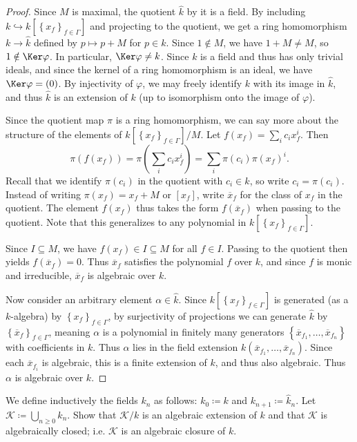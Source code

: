 \documentclass[11pt, letterpaper]{article}
\begin{document}
\begin{proof}
	Since $M$ is maximal, the quotient $\hat{k} $ by it is a field. By including $k\hookrightarrow k[\left\{ x_f \right\} _{f\in \Gamma } ]$ and projecting to the quotient, we get a ring homomorphism $k\to \hat{k} $ defined by $p\mapsto p+M$ for $p\in k$. Since $1\notin M$, we have $1+M \neq M$, so $1\notin \Ker \varphi $. In particular, $\Ker \varphi \neq k$. Since $k$ is a field and thus has only trivial ideals, and since the kernel of a ring homomorphism is an ideal, we have $\Ker \varphi =(0)$. By injectivity of $\varphi $, we may freely identify $k$ with its image in $\hat{k} $, and thus $\hat{k} $ is an extension of $k$ (up to isomorphism onto the image of $\varphi $).

	Since the quotient map $\pi $ is a ring homomorphism, we can say more about the structure of the elements of $k[\left\{ x_f \right\} _{f\in \Gamma } ]/M$. Let $f(x_f)=\sum_{i} c_ix_f^i$. Then
	\[
		\pi (f(x_f))=\pi \left( \sum_{i} c_ix_f^i \right) =\sum_{i} \pi (c_i)\pi (x_f)^i
	.\]
	Recall that we identify $\pi (c_i)$ in the quotient with $c_i\in k$, so write $c_i=\pi (c_i)$. Instead of writing $\pi (x_f)=x_f+M$ or $[x_f]$, write $\overline{x} _f$ for the class of $x_f$ in the quotient. The element $f(x_f)$ thus takes the form $f(\overline{x} _f)$ when passing to the quotient. Note that this generalizes to any polynomial in $k[\left\{ x_f \right\} _{f\in \Gamma } ]$.

	Since $I\subseteq M$, we have $f(x_f)\in I \subseteq M$ for all $f\in I$. Passing to the quotient then yields $f(\overline{x}_f)=0$. Thus $\overline{x} _f$ satisfies the polynomial $f$ over $k$, and since $f$ is monic and irreducible, $\overline{x} _f$ is algebraic over $k$.

	Now consider an arbitrary element $\alpha \in \hat{k} $. Since $k[\left\{ x_f \right\} _{f\in \Gamma } ]$ is generated (as a $k$-algebra) by $\left\{ x_f \right\} _{f\in \Gamma } $, by surjectivity of projections we can generate $\hat{k} $ by $\left\{ \overline{x}_f \right\} _{f\in \Gamma } $, meaning $\alpha $ is a polynomial in finitely many generators $\left\{ \overline{x} _{f_1} , \ldots , \overline{x} _{f_n}  \right\} $ with coefficients in $k$. Thus $\alpha $ lies in the field extension $k(\overline{x} _{f_1} , \ldots , \overline{x} _{f_n} )$. Since each $\overline{x} _{f_i} $ is algebraic, this is a finite extension of $k$, and thus also algebraic. Thus $\alpha $ is algebraic over $k$.
\end{proof}
\begin{problem}\label{12.3}
	We define inductively the fields $k_n$ as follows: $k_0\coloneqq k$ and $k_{n+1} \coloneqq \hat{k}_n $. Let $\mathcal{K} \coloneqq \bigcup_{n\geq 0} k_n$. Show that $\mathcal{K} /k$ is an algebraic extension of $k$ and that $\mathcal{K} $ is algebraically closed; i.e. $\mathcal{K} $ is an algebraic closure of $k$.
\end{problem}
\end{document}
